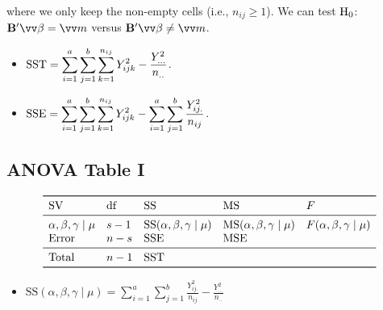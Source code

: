 where we only keep the non-empty cells (i.e., $ n_{ij}\ge 1 $).
We can test $ \text{H}_0 $: $ \Matrix{B}'\Vector{\beta}=\Vector{m} $
versus $ \Matrix{B}'\Vector{\beta}\ne \Vector{m} $.
\begin{itemize}
    \item $ \displaystyle \text{SST} =\sum_{i=1}^{a}\sum_{j=1}^{b}\sum_{k=1}^{n_{ij}}Y_{ijk}^2-\frac{Y_{...}^2}{n_{..}} $.
    \item $ \displaystyle \text{SSE} =\sum_{i=1}^{a}\sum_{j=1}^{b}\sum_{k=1}^{n_{ij}}Y_{ijk}^2-\sum_{i=1}^{a}\sum_{j=1}^{b}\frac{Y_{ij.}^2}{n_{ij}} $.
\end{itemize}
\subsection*{ANOVA Table I}
\[ \begin{array}{lllll}
        \toprule
        \text{SV}                   & \text{df} & \text{SS}                              & \text{MS}                              & F                              \\
        \midrule
        \alpha,\beta,\gamma\mid \mu & s-1       & \text{SS}(\alpha,\beta,\gamma\mid \mu) & \text{MS}(\alpha,\beta,\gamma\mid \mu) & F(\alpha,\beta,\gamma\mid \mu) \\
        \text{Error}                & n-s       & \SSE                                   & \MSE                                                                    \\
        \midrule
        \text{Total}                & n-1       & \SST                                                                                                             \\
        \bottomrule
    \end{array} \]
\begin{itemize}
    \item $ \displaystyle \text{SS}(\alpha,\beta,\gamma\mid \mu) =\sum_{i=1}^{a}\sum_{j=1}^{b}\frac{Y_{ij.}^2}{n_{ij}}-\frac{Y_{...}^2}{n_{..}} $
\end{itemize}
